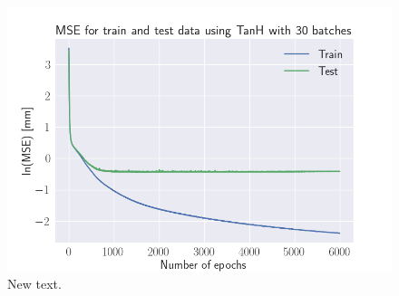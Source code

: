 \documentclass[a4paper, UKenglish, 11pt]{uiomaster}
\begin{document}
\begin{figure}[!htb]
    \centering
    \includegraphics[width=\linewidth]{../Code/plots/finals/MSE_NN_1_10000_l1_l2_20mm_TanH_30_6000.png}
    \caption{New text.}
    \label{fig:dipole_area_result}
\end{figure}
\end{document}
